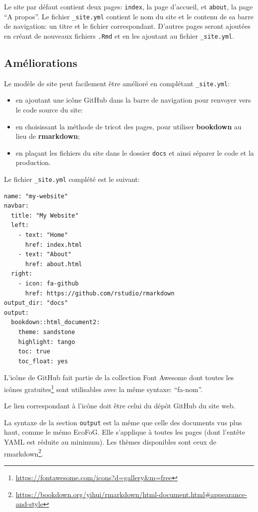 \documentclass[
  11pt,
  french,
  a4paper,
  extrafontsizes,onecolumn,openright
  ]{memoir}
\providecommand{\tightlist}{%
  \setlength{\itemsep}{0pt}\setlength{\parskip}{0pt}}
\begin{document}
Le site par défaut contient deux pages: \texttt{index}, la page d'accueil, et \texttt{about}, la page ``A propos''.
Le fichier \texttt{\_site.yml} contient le nom du site et le contenu de sa barre de navigation: un titre et le fichier correspondant.
D'autres pages seront ajoutées en créant de nouveaux fichiers \texttt{.Rmd} et en les ajoutant au fichier \texttt{\_site.yml}.

\hypertarget{amuxe9liorations}{%
\subsection{Améliorations}\label{amuxe9liorations}}

Le modèle de site peut facilement être amélioré en complétant \texttt{\_site.yml}:

\begin{itemize}
\tightlist
\item
  en ajoutant une icône GitHub dans la barre de navigation pour renvoyer vers le code source du site:
\item
  en choisissant la méthode de tricot des pages, pour utiliser \textbf{bookdown} au lieu de \textbf{rmarkdown};
\item
  en plaçant les fichiers du site dans le dossier \texttt{docs} et ainsi séparer le code et la production.
\end{itemize}

Le fichier \texttt{\_site.yml} complété est le suivant:

\begin{verbatim}
name: "my-website"
navbar:
  title: "My Website"
  left:
    - text: "Home"
      href: index.html
    - text: "About"
      href: about.html
  right:
    - icon: fa-github
      href: https://github.com/rstudio/rmarkdown
output_dir: "docs"
output:
  bookdown::html_document2:
    theme: sandstone
    highlight: tango
    toc: true
    toc_float: yes
\end{verbatim}

L'icône de GitHub fait partie de la collection Font Awesome dont toutes les icônes gratuites\footnote{\url{https://fontawesome.com/icons?d=gallery\&m=free}} sont utilisables avec la même syntaxe: ``fa-nom''.

Le lien correspondant à l'icône doit être celui du dépôt GitHub du site web.

La syntaxe de la section \texttt{output} est la même que celle des documents vus plus haut, comme le mémo EcoFoG.
Elle s'applique à toutes les pages (dont l'entête YAML est réduite au minimum).
Les thèmes disponibles sont ceux de rmarkdown\footnote{\url{https://bookdown.org/yihui/rmarkdown/html-document.html\#appearance-and-style}}.
\end{document}
